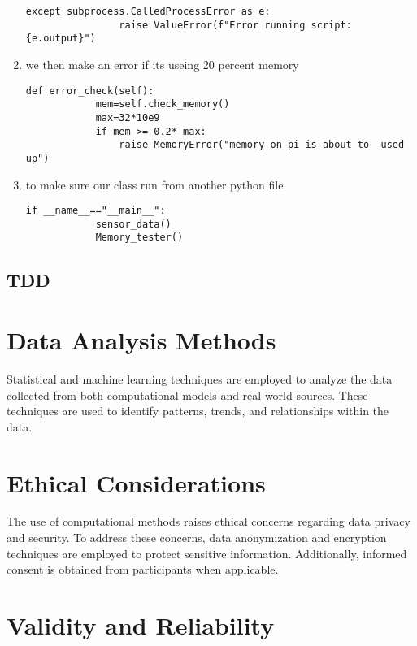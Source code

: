 \begin{enumerate}
\begin{lstlisting}[style=mystyle]
            except subprocess.CalledProcessError as e:
                raise ValueError(f"Error running script:{e.output}")
    \end{lstlisting}
    \item  we then  make an error if its useing  20 percent memory
    \begin{lstlisting}[style=mystyle]
        def error_check(self):
            mem=self.check_memory()
            max=32*10e9
            if mem >= 0.2* max:
                raise MemoryError("memory on pi is about to  used up")
    \end{lstlisting}
    \item to make sure  our class run from another python file 
    \begin{lstlisting}[style=mystyle]
        if __name__=="__main__":
            sensor_data()
            Memory_tester()
    \end{lstlisting}
\end{enumerate}

\newpage
\subsection{TDD}


\section{Data Analysis Methods}

Statistical and machine learning techniques are employed to analyze the data collected from both computational models and real-world sources. These techniques are used to identify patterns, trends, and relationships within the data.

\section{Ethical Considerations}

The use of computational methods raises ethical concerns regarding data privacy and security. To address these concerns, data anonymization and encryption techniques are employed to protect sensitive information. Additionally, informed consent is obtained from participants when applicable.

\section{Validity and Reliability}

